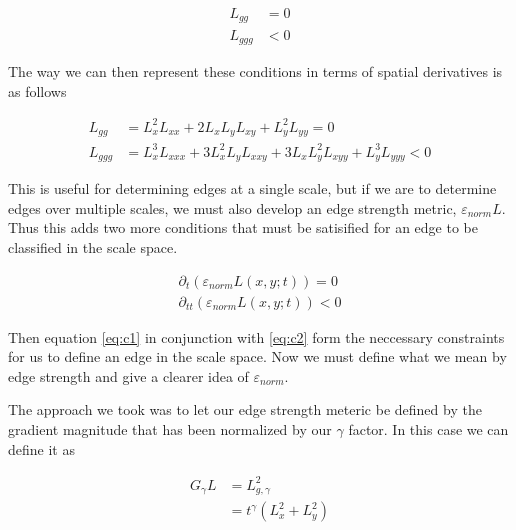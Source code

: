 \documentclass{article}
\begin{document}
    \begin{equation} \label{eq:c1}
        \begin{aligned}
            L_{gg} &= 0 \\ 
            L_{ggg} &< 0
        \end{aligned}
    \end{equation}

    The way we can then represent these conditions in terms of spatial derivatives is as follows

    \begin{equation}
        \begin{aligned}
            L_{gg} &= L_x^2L_{xx}+2L_xL_yL_{xy}+L_y^2L_{yy} = 0 \\
            L_{ggg} &= L_x^3L_{xxx} +3L_x^2L_yL_{xxy}+3L_xL_y^2L_{xyy}+L_y^3L_{yyy} < 0
        \end{aligned}
    \end{equation}

    This is useful for determining edges at a single scale, but if we are to determine edges over multiple scales, we must also develop an edge strength metric, $\varepsilon_{norm}L$. Thus this adds two more conditions that must be satisified for an edge to be classified in the scale space. 

    \begin{equation} \label{eq:c2}
        \begin{aligned}
            \partial_t(\varepsilon_{norm}L(x,y;t)) = 0\\
            \partial_{tt}(\varepsilon_{norm}L(x,y;t)) < 0
        \end{aligned}
    \end{equation}

    Then equation \ref{eq:c1} in conjunction with \ref{eq:c2} form the neccessary constraints for us to define an edge in the scale space. Now we must define what we mean by edge strength and give a clearer idea of $\varepsilon_{norm}$.

    The approach we took was to let our edge strength meteric be defined by the gradient magnitude that has been normalized by our $\gamma$ factor. In this case we can define it as 

    \begin{equation}
        \begin{aligned}
            G_{\gamma}L &= L_{g,\gamma}^2 \\
            &= t^{\gamma}(L_x^2+L_y^2)
        \end{aligned}
    \end{equation}
\end{document}
